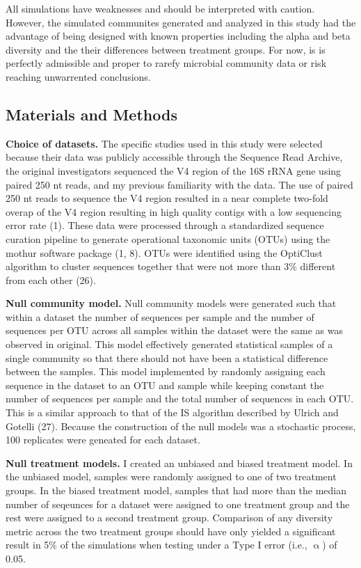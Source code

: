 \documentclass[
]{article}
\begin{document}
All simulations have weaknesses and should be interpreted with caution.
However, the simulated communites generated and analyzed in this study
had the advantage of being designed with known properties including the
alpha and beta diversity and the their differences between treatment
groups. For now, is is perfectly admissible and proper to rarefy
microbial community data or risk reaching unwarrented conclusions.

\hypertarget{materials-and-methods}{%
\subsection{Materials and Methods}\label{materials-and-methods}}

\textbf{Choice of datasets.} The specific studies used in this study
were selected because their data was publicly accessible through the
Sequence Read Archive, the original investigators sequenced the V4
region of the 16S rRNA gene using paired 250 nt reads, and my previous
familiarity with the data. The use of paired 250 nt reads to sequence
the V4 region resulted in a near complete two-fold overap of the V4
region resulting in high quality contigs with a low sequencing error
rate (1). These data were processed through a standardized sequence
curation pipeline to generate operational taxonomic units (OTUs) using
the mothur software package (1, 8). OTUs were identified using the
OptiClust algorithm to cluster sequences together that were not more
than 3\% different from each other (26).

\textbf{Null community model.} Null community models were generated such
that within a dataset the number of sequences per sample and the number
of sequences per OTU across all samples within the dataset were the same
as was observed in original. This model effectively generated
statistical samples of a single community so that there should not have
been a statistical difference between the samples. This model
implemented by randomly assigning each sequence in the dataset to an OTU
and sample while keeping constant the number of sequences per sample and
the total number of sequences in each OTU. This is a similar approach to
that of the IS algorithm described by Ulrich and Gotelli (27). Because
the construction of the null models was a stochastic process, 100
replicates were geneated for each dataset.

\textbf{Null treatment models.} I created an unbiased and biased
treatment model. In the unbiased model, samples were randomly assigned
to one of two treatment groups. In the biased treatment model, samples
that had more than the median number of seqeunces for a dataset were
assigned to one treatment group and the rest were assigned to a second
treatment group. Comparison of any diversity metric across the two
treatment groups should have only yielded a significant result in 5\% of
the simulations when testing under a Type I error (i.e., \(\upalpha\))
of 0.05.
\end{document}
